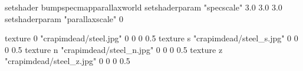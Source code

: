 setshader bumpspecmapparallaxworld
setshaderparam "specscale" 3.0 3.0 3.0
setshaderparam "parallaxscale" 0

texture 0 "crapimdead/steel.jpg" 0 0 0 0.5
texture s "crapimdead/steel_s.jpg" 0 0 0 0.5
texture n "crapimdead/steel_n.jpg" 0 0 0 0.5
texture z "crapimdead/steel_z.jpg" 0 0 0 0.5

